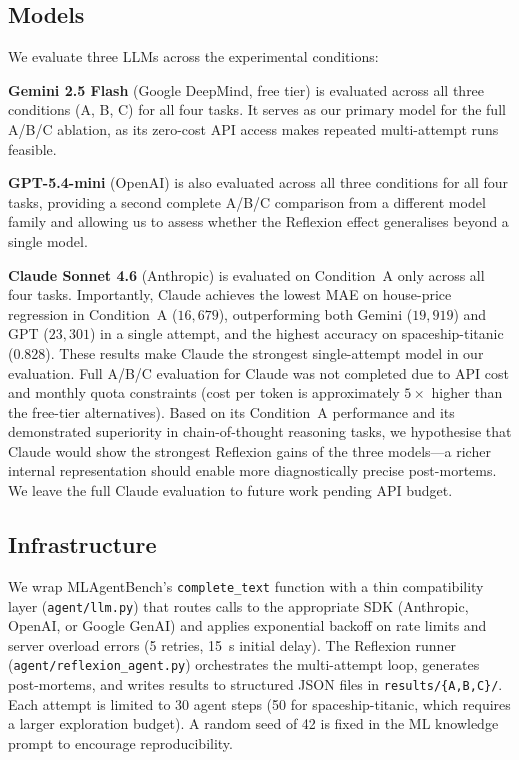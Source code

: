 \documentclass[conference]{IEEEtran}
\begin{document}
\subsection{Models}

We evaluate three LLMs across the experimental conditions:

\textbf{Gemini 2.5 Flash} (Google DeepMind, free tier) is evaluated across all
three conditions (A, B, C) for all four tasks. It serves as our primary
model for the full A/B/C ablation, as its zero-cost API access makes
repeated multi-attempt runs feasible.

\textbf{GPT-5.4-mini} (OpenAI) is also evaluated across all three conditions
for all four tasks, providing a second complete A/B/C comparison from a
different model family and allowing us to assess whether the Reflexion effect
generalises beyond a single model.

\textbf{Claude Sonnet 4.6} (Anthropic) is evaluated on Condition~A only
across all four tasks. Importantly, Claude achieves the lowest MAE on
house-price regression in Condition~A ($16{,}679$), outperforming both Gemini
($19{,}919$) and GPT ($23{,}301$) in a single attempt, and the highest accuracy
on spaceship-titanic ($0.828$). These results make Claude the strongest
single-attempt model in our evaluation. Full A/B/C evaluation for Claude was
not completed due to API cost and monthly quota constraints (cost per token is
approximately $5{\times}$ higher than the free-tier alternatives). Based on its
Condition~A performance and its demonstrated superiority in chain-of-thought
reasoning tasks, we hypothesise that Claude would show the strongest Reflexion
gains of the three models---a richer internal representation should enable
more diagnostically precise post-mortems. We leave the full Claude evaluation
to future work pending API budget.

\subsection{Infrastructure}

We wrap MLAgentBench's \texttt{complete\_text} function with a thin
compatibility layer (\texttt{agent/llm.py}) that routes calls to the
appropriate SDK (Anthropic, OpenAI, or Google GenAI) and applies exponential
backoff on rate limits and server overload errors (5 retries, 15~s initial
delay). The Reflexion runner (\texttt{agent/reflexion\_agent.py}) orchestrates
the multi-attempt loop, generates post-mortems, and writes results to
structured JSON files in \texttt{results/\{A,B,C\}/}. Each attempt is
limited to 30 agent steps (50 for spaceship-titanic, which requires a
larger exploration budget). A random seed of 42 is fixed in the ML knowledge
prompt to encourage reproducibility.
\end{document}
